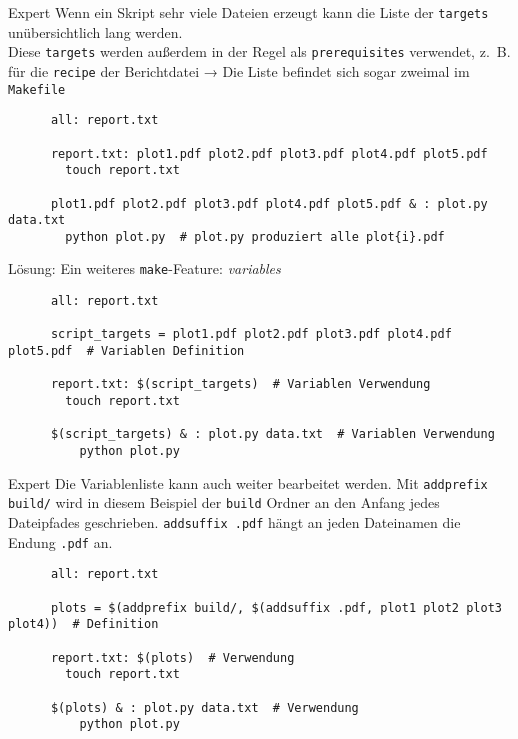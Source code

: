 \begin{frame}[fragile]{Expert}
  Wenn ein Skript sehr viele Dateien erzeugt kann die Liste der \texttt{targets} unübersichtlich lang werden.\\
  Diese \texttt{targets} werden außerdem in der Regel als \texttt{prerequisites} verwendet,
  z.~B. für die \texttt{recipe} der Berichtdatei  → Die Liste befindet sich sogar zweimal im \texttt{Makefile}

  \begin{center}
    \small
    \begin{verbatim}
      all: report.txt

      report.txt: plot1.pdf plot2.pdf plot3.pdf plot4.pdf plot5.pdf
        touch report.txt

      plot1.pdf plot2.pdf plot3.pdf plot4.pdf plot5.pdf & : plot.py data.txt
        python plot.py  # plot.py produziert alle plot{i}.pdf 
    \end{verbatim}
  \end{center}
  Lösung: Ein weiteres \texttt{make}-Feature: \emph{variables}
  \begin{center}
    \small
    \begin{verbatim}
      all: report.txt

      script_targets = plot1.pdf plot2.pdf plot3.pdf plot4.pdf plot5.pdf  # Variablen Definition

      report.txt: $(script_targets)  # Variablen Verwendung
        touch report.txt
      
      $(script_targets) & : plot.py data.txt  # Variablen Verwendung
          python plot.py
    \end{verbatim}
  \end{center}
\end{frame}

\begin{frame}[fragile]{Expert}
  Die Variablenliste kann auch weiter bearbeitet werden.
  Mit \texttt{addprefix build/} wird in diesem Beispiel der \texttt{build} Ordner
  an den Anfang jedes Dateipfades geschrieben.
  \texttt{addsuffix .pdf} hängt an jeden Dateinamen die Endung \texttt{.pdf} an.
  \begin{center}
    \small
    \begin{verbatim}
      all: report.txt

      plots = $(addprefix build/, $(addsuffix .pdf, plot1 plot2 plot3 plot4))  # Definition

      report.txt: $(plots)  # Verwendung
        touch report.txt
      
      $(plots) & : plot.py data.txt  # Verwendung
          python plot.py
    \end{verbatim}
  \end{center}
\end{frame}